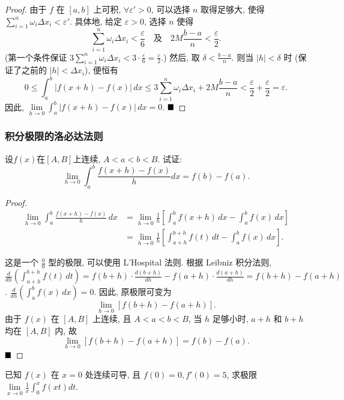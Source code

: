 \documentclass[lang=cn,newtx,10pt,scheme=chinese]{elegantbook}
\begin{document}
\begin{proof}
由于 $f$ 在 $[a,b]$ 上可积, $\forall \varepsilon' > 0$, 可以选择 $n$ 取得足够大, 使得 $\sum_{i=1}^n \omega_i \Delta x_i < \varepsilon'$.
具体地, 给定 $\varepsilon > 0$, 选择 $n$ 使得
$$ \sum_{i=1}^n \omega_i \Delta x_i < \frac{\varepsilon}{6} \quad \text{及} \quad 2M \frac{b-a}{n} < \frac{\varepsilon}{2}. $$
(第一个条件保证 $3 \sum_{i=1}^n \omega_i \Delta x_i < 3 \cdot \frac{\varepsilon}{6} = \frac{\varepsilon}{2}$.)
然后, 取 $\delta < \frac{b-a}{n}$. 则当 $|h| < \delta$ 时 (保证了之前的 $|h| < \Delta x_i$), 便恒有
$$ 0 \leq \int_a^b |f(x+h)-f(x)| \,dx \leq 3 \sum_{i=1}^n \omega_i \Delta x_i + 2M \frac{b-a}{n} < \frac{\varepsilon}{2} + \frac{\varepsilon}{2} = \varepsilon. $$
因此, $\lim\limits_{h \to 0} \int_a^b |f(x+h) - f(x)| \,dx = 0$.
$\hfill \blacksquare$
\end{proof}

\subsubsection*{积分极限的洛必达法则}
\begin{example}[$\bigstar$]\label{eg:4.1.12}
设$f(x)$在$[A,B]$上连续, $A<a<b<B$. 试证:
$$ \lim\limits_{h \to 0} \int_{a}^{b} \frac{f(x+h)-f(x)}{h} dx = f(b)-f(a). $$
\end{example}

\begin{proof}
\begin{align*} \lim\limits_{h \to 0} \int_a^b \frac{f(x+h)-f(x)}{h} \,dx &= \lim\limits_{h \to 0} \frac{1}{h} \left[ \int_a^b f(x+h) \,dx - \int_a^b f(x) \,dx \right] \\ &= \lim\limits_{h \to 0} \frac{1}{h} \left[ \int_{a+h}^{b+h} f(t) \,dt - \int_a^b f(x) \,dx \right]. \end{align*}

这是一个 $\frac{0}{0}$ 型的极限, 可以使用 L'Hospital 法则.
根据 Leibniz 积分法则, $\frac{d}{dh} \left( \int_{a+h}^{b+h} f(t) \,dt \right) = f(b+h) \cdot \frac{d(b+h)}{dh} - f(a+h) \cdot \frac{d(a+h)}{dh} = f(b+h) - f(a+h)$.
$\frac{d}{dh} \left( \int_a^b f(x) \,dx \right) = 0$.
因此, 原极限可变为
$$  \lim\limits_{h \to 0} [f(b+h)-f(a+h)]. $$
由于 $f(x)$ 在 $[A,B]$ 上连续, 且 $A<a<b<B$, 当 $h$ 足够小时, $a+h$ 和 $b+h$ 均在 $[A,B]$ 内, 故
$$ \lim\limits_{h \to 0} [f(b+h)-f(a+h)] = f(b)-f(a). $$ $\hfill \blacksquare$
\end{proof}

\begin{exercise}[$\bigstar$]
已知 $f(x)$ 在 $x=0$ 处连续可导, 且 $f(0)=0, f'(0)=5$, 求极限 $\lim\limits_{x \to 0} \frac{1}{x} \int_{0}^{x} f(xt) dt$.
\end{exercise}
\end{document}
